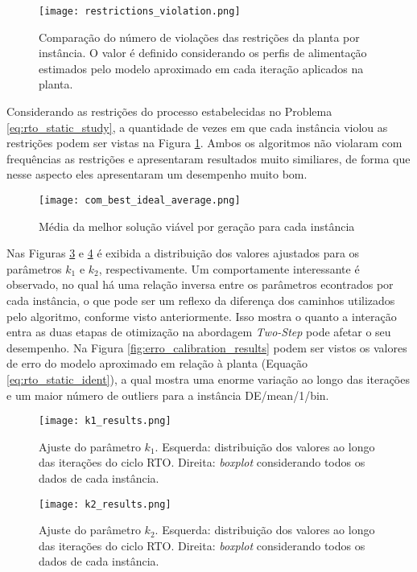 \documentclass[conference]{IEEEtran}
\begin{document}
\begin{figure}[h!]
	\centering
	\texttt{[image: restrictions\_violation.png]}
	\caption{Comparação do número de violações das restrições da planta por instância. O valor é definido considerando os perfis de alimentação estimados pelo modelo aproximado em cada iteração aplicados na planta.}
	\label{fig:restrictions_violation}
\end{figure}


Considerando as restrições do processo estabelecidas no Problema \ref{eq:rto_static_study}, a quantidade de vezes em que cada instância violou as restrições podem ser vistas na Figura \ref{fig:restrictions_violation}. Ambos os algoritmos não violaram com frequências as restrições e apresentaram resultados muito similiares, de forma que nesse aspecto eles apresentaram um desempenho muito bom.


\begin{figure}[h!]
	\centering
	\texttt{[image: com\_best\_ideal\_average.png]}
	\caption{Média da melhor solução viável por geração para cada instância}
	\label{fig:com_best_ideal_average}
\end{figure}


Nas Figuras \ref{fig:k1_results} e \ref{fig:k2_results} é exibida a distribuição dos valores ajustados para os parâmetros $k_1$ e $k_2$, respectivamente. Um comportamente interessante é observado, no qual há uma relação inversa entre os parâmetros econtrados por cada instância, o que pode ser um reflexo da diferença dos caminhos utilizados pelo algoritmo, conforme visto anteriormente. Isso mostra o quanto a interação entra as duas etapas de otimização na abordagem \textit{Two-Step} pode afetar o seu desempenho.
Na Figura \ref{fig:erro_calibration_results} podem ser vistos os valores de erro do modelo aproximado em relação à planta (Equação \ref{eq:rto_static_ident}), a qual mostra uma enorme variação ao longo das iterações e um maior número de outliers para a instância DE/mean/1/bin. 

\begin{figure}[h!]
	\centering
	\texttt{[image: k1\_results.png]}
	\caption{Ajuste do parâmetro $k_1$. Esquerda: distribuição dos valores ao longo das iterações do ciclo RTO. Direita: \textit{boxplot} considerando todos os dados de cada instância.}
	\label{fig:k1_results}
\end{figure}

\begin{figure}[h!]
	\centering
	\texttt{[image: k2\_results.png]}
	\caption{Ajuste do parâmetro $k_2$. Esquerda: distribuição dos valores ao longo das iterações do ciclo RTO. Direita: \textit{boxplot} considerando todos os dados de cada instância.}
	\label{fig:k2_results}
\end{figure}
\end{document}
